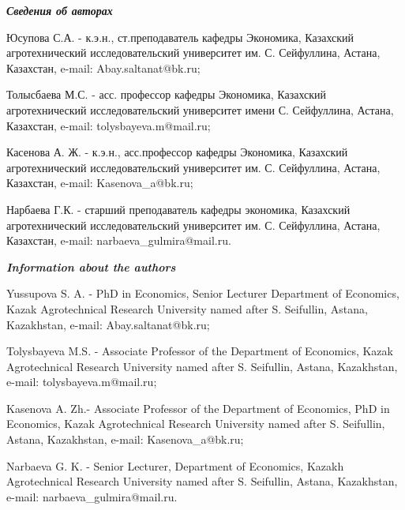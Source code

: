\begin{authorinfo}
\hspace{1em}\emph{{\bfseries Сведения об авторах}}

Юсупова С.А. - к.э.н., ст.преподаватель кафедры Экономика, Казахский
агротехнический исследовательский университет им. С. Сейфуллина, Астана,
Казахстан, e-mail: Abay.saltanat@bk.ru;

Толысбаева М.С. - асс. профессор кафедры Экономика, Казахский
агротехнический исследовательский университет имени С. Сейфуллина,
Астана, Казахстан, e-mail: tolysbayeva.m@mail.ru;

Касенова А. Ж. - к.э.н., асс.профессор кафедры Экономика, Казахский
агротехнический исследовательский университет им. С. Сейфуллина, Астана,
Казахстан, e-mail: Kasenova\_a@bk.ru;

Нарбаева Г.К. - старший преподаватель кафедры экономика, Казахский
агротехнический исследовательский университет им. С. Сейфуллина, Астана,
Казахстан, e-mail: narbaeva\_gulmira@mail.ru.

\hspace{1em}\emph{{\bfseries Information about the authors}}

Yussupova S. A. - PhD in Economics, Senior Lecturer Department of
Economics, Kazak Agrotechnical Research University named after S.
Seifullin, Astana, Kazakhstan, e-mail: Abay.saltanat@bk.ru;

Tolysbayeva M.S. - Associate Professor of the Department of Economics,
Kazak Agrotechnical Research University named after S. Seifullin,
Astana, Kazakhstan, e-mail: tolysbayeva.m@mail.ru;

Kasenova A. Zh.- Associate Professor of the Department of Economics, PhD
in Economics, Kazak Agrotechnical Research University named after S.
Seifullin, Astana, Kazakhstan, e-mail: Kasenova\_a@bk.ru;

Narbaeva G. K. - Senior Lecturer, Department of Economics, Kazakh
Agrotechnical Research University named after S. Seifullin, Astana,
Kazakhstan, e-mail: narbaeva\_gulmira@mail.ru.
\end{authorinfo}
